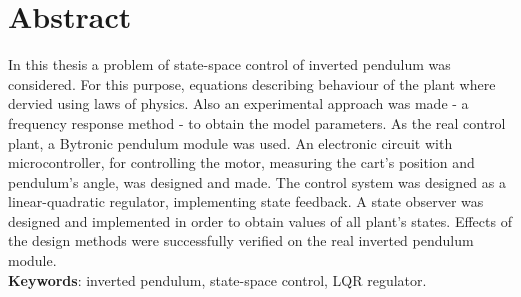 \chapter*{Abstract}
In this thesis a problem of state-space control of inverted pendulum was considered. For this purpose, equations describing behaviour of the plant where dervied using laws of physics. Also an experimental approach was made - a frequency response method - to obtain the model parameters. As the real control plant, a Bytronic pendulum module was used. An electronic circuit with microcontroller, for controlling the motor, measuring the cart's position and pendulum's angle, was designed and made. The control system was designed as a linear-quadratic regulator, implementing state feedback. A state observer was designed and implemented in order to obtain values of all plant's states. Effects of the design methods were successfully verified on the real inverted pendulum module.
\newline
\\
\textbf{Keywords}: inverted pendulum, state-space control, LQR regulator. 



